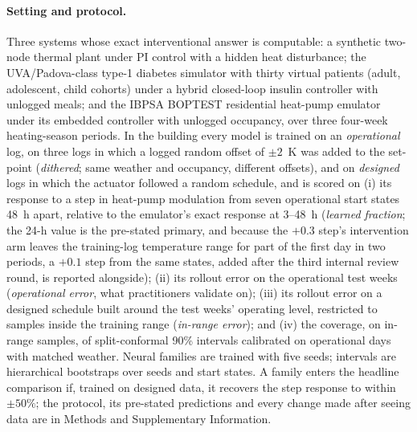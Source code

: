 \documentclass[11pt]{article}
\begin{document}
\paragraph{Setting and protocol.} Three systems whose exact interventional answer is computable: a synthetic two-node thermal plant under PI control with a hidden heat disturbance; the UVA/Padova-class type-1 diabetes simulator with thirty virtual patients (adult, adolescent, child cohorts) under a hybrid closed-loop insulin controller with unlogged meals; and the IBPSA BOPTEST residential heat-pump emulator under its embedded controller with unlogged occupancy, over three four-week heating-season periods. In the building every model is trained on an \emph{operational} log, on three logs in which a logged random offset of $\pm2$~K was added to the set-point (\emph{dithered}; same weather and occupancy, different offsets), and on \emph{designed} logs in which the actuator followed a random schedule, and is scored on (i) its response to a step in heat-pump modulation from seven operational start states 48~h apart, relative to the emulator's exact response at 3--48~h (\emph{learned fraction}; the 24-h value is the pre-stated primary, and because the $+0.3$ step's intervention arm leaves the training-log temperature range for part of the first day in two periods, a $+0.1$ step from the same states, added after the third internal review round, is reported alongside); (ii) its rollout error on the operational test weeks (\emph{operational error}, what practitioners validate on); (iii) its rollout error on a designed schedule built around the test weeks' operating level, restricted to samples inside the training range (\emph{in-range error}); and (iv) the coverage, on in-range samples, of split-conformal 90\% intervals calibrated on operational days with matched weather. Neural families are trained with five seeds; intervals are hierarchical bootstraps over seeds and start states. A family enters the headline comparison if, trained on designed data, it recovers the step response to within $\pm50\%$; the protocol, its pre-stated predictions and every change made after seeing data are in Methods and Supplementary Information.
\end{document}
